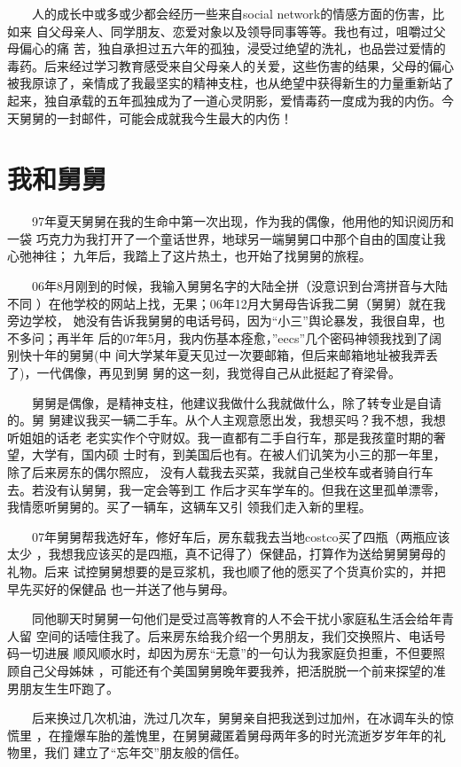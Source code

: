 \documentclass[12pt]{book}
\begin{document}
　　人的成长中或多或少都会经历一些来自social network的情感方面的伤害，比如来
自父母亲人、同学朋友、恋爱对象以及领导同事等等。我也有过，咀嚼过父母偏心的痛
苦，独自承担过五六年的孤独，浸受过绝望的洗礼，也品尝过爱情的毒药。后来经过学习教育感受来自父母亲人的关爱，这些伤害的结果，父母的偏心被我原谅了，亲情成了我最坚实的精神支柱，也从绝望中获得新生的力量重新站了起来，独自承载的五年孤独成为了一道心灵阴影，爱情毒药一度成为我的内伤。今天舅舅的一封邮件，可能会成就我今生最大的内伤！
\section{我和舅舅}
\label{sec-8-27}

　　97年夏天舅舅在我的生命中第一次出现，作为我的偶像，他用他的知识阅历和一袋
巧克力为我打开了一个童话世界，地球另一端舅舅口中那个自由的国度让我心弛神往；
九年后，我踏上了这片热土，也开始了找舅舅的旅程。

　　06年8月刚到的时候，我输入舅舅名字的大陆全拼（没意识到台湾拼音与大陆不同
）在他学校的网站上找，无果；06年12月大舅母告诉我二舅（舅舅）就在我旁边学校，
她没有告诉我舅舅的电话号码，因为“小三”舆论暴发，我很自卑，也不多问；再半年
后的07年5月，我内伤基本痊愈，”eecs”几个密码神领我找到了阔别快十年的舅舅(中
间大学某年夏天见过一次要邮箱，但后来邮箱地址被我弄丢了)，一代偶像，再见到舅
舅的这一刻，我觉得自己从此挺起了脊梁骨。

　　舅舅是偶像，是精神支柱，他建议我做什么我就做什么，除了转专业是自请的。舅
舅建议我买一辆二手车。从个人主观意愿出发，我想买吗？我不想，我想听姐姐的话老
老实实作个守财奴。我一直都有二手自行车，那是我孩童时期的奢望，大学有，国内硕
士时有，到美国后也有。在被人们讥笑为小三的那一年里，除了后来房东的偶尔照应，
没有人载我去买菜，我就自己坐校车或者骑自行车去。若没有认舅舅，我一定会等到工
作后才买车学车的。但我在这里孤单漂零，我情愿听舅舅的。买了一辆车，这辆车又引
领我们走入新的里程。

　　07年舅舅帮我选好车，修好车后，房东载我去当地costco买了四瓶（两瓶应该太少
，我想我应该买的是四瓶，真不记得了）保健品，打算作为送给舅舅舅母的礼物。后来
试控舅舅想要的是豆浆机，我也顺了他的愿买了个货真价实的，并把早先买好的保健品
也一并送了他与舅母。

　　同他聊天时舅舅一句他们是受过高等教育的人不会干扰小家庭私生活会给年青人留
空间的话噎住我了。后来房东给我介绍一个男朋友，我们交换照片、电话号码一切进展
顺风顺水时，却因为房东“无意”的一句认为我家庭负担重，不但要照顾自己父母姊妹
，可能还有个美国舅舅晚年要我养，把活脱脱一个前来探望的准男朋友生生吓跑了。

　　后来换过几次机油，洗过几次车，舅舅亲自把我送到过加州，在冰调车头的惊慌里
，在撞爆车胎的羞愧里，在舅舅藏匿着舅母两年多的时光流逝岁岁年年的礼物里，我们
建立了“忘年交”朋友般的信任。
\end{document}

